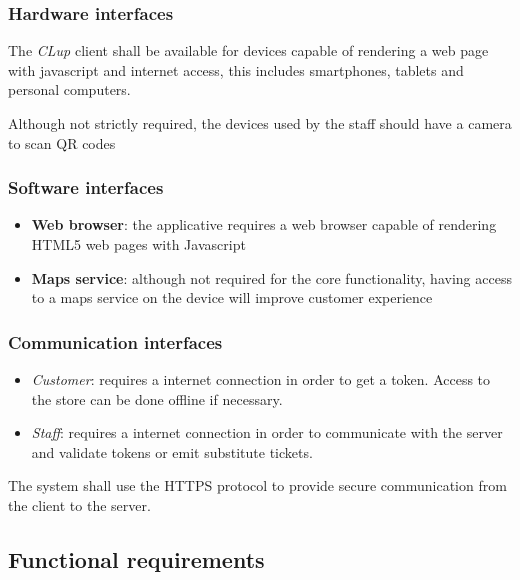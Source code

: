 \subsubsection{Hardware interfaces}
The \emph{CLup} client shall be available for devices capable of rendering a web page with javascript and internet access, this includes smartphones, tablets and personal computers.

Although not strictly required, the devices used by the staff should have a camera to scan QR codes

\subsubsection{Software interfaces}
\begin{itemize}
    \item \textbf{Web browser}: the applicative requires a web browser capable of rendering HTML5 web pages with Javascript
    \item \textbf{Maps service}: although not required for the core functionality, having access to a maps service on the device will improve customer experience
\end{itemize}

\subsubsection{Communication interfaces}
\begin{itemize}
    \item \emph{Customer}: requires a internet connection in order to get a token. Access to the store can be done offline if necessary.
    \item \emph{Staff}: requires a internet connection in order to communicate with the server and validate tokens or emit substitute tickets.
\end{itemize}
The system shall use the HTTPS protocol to provide secure communication from the client to the server.
\subsection{Functional requirements}

